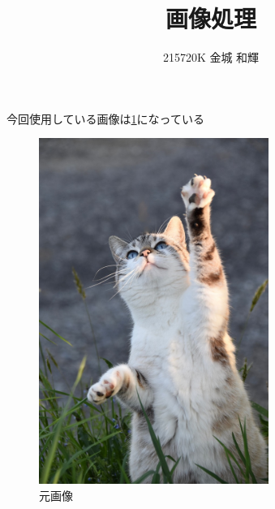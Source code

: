 \documentclass[a4paper, 11pt]{jsarticle}
\title{画像処理}
\author{215720K 金城 和輝}
\begin{document}
\maketitle
\tableofcontents

\clearpage

今回使用している画像は\ref{img1}になっている
\begin{figure}[htbp]
  \begin{center}
    \includegraphics[width=75mm]{cat-5098930_1280.jpg}
    \caption{元画像}
    \label{img1}
  \end{center}
\end{figure}

\clearpage
\end{document}
